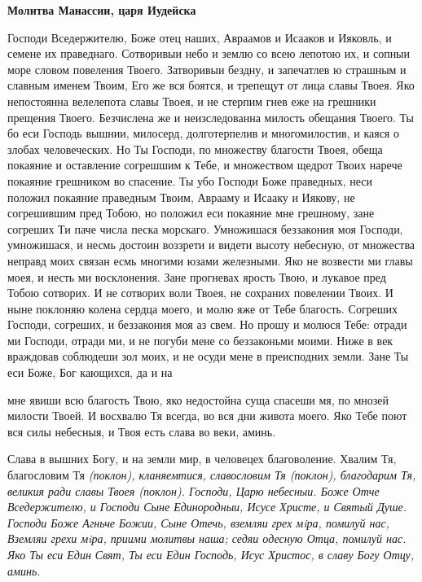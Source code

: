  

\bfseries Молитва Манассии, царя Иудейска\normalfont{}


   Господи Вседержителю, Боже отец наших, Авраамов и Исааков и
Ияковль, и семене их праведнаго. Сотворивыи небо и землю со всею лепотою
их, и сопныи море словом повеления Твоего. Затворивыи бездну, и
запечатлев ю страшным и славным именем Твоим, Его же вся боятся, и
трепещут от лица славы Твоея. Яко непостоянна велелепота славы Твоея,
и не стерпим гнев еже на грешники прещения Твоего. Безчислена
же и неизследованна милость обещания Твоего. Ты бо еси Господь
вышнии, милосерд, долготерпелив и многомилостив, и каяся о злобах
человеческих. Но Ты Господи, по множеству благости Твоея, обеща
покаяние и оставление согрешшим к Тебе, и множеством щедрот
Твоих нарече покаяние грешником во спасение. Ты убо Господи Боже
праведных, неси положил покаяние праведным Твоим, Аврааму и Исааку и
Иякову, не согрешившим пред Тобою, но положил еси покаяние мне
грешному, зане согреших Ти паче числа песка морскаго. Умножишася
беззакония моя Господи, умножишася, и несмь достоин воззрети и
видети высоту небесную, от множества неправд моих связан есмь
многими юзами железными. Яко не возвести ми главы моея, и несть ми
восклонения. Зане прогневах ярость Твою, и лукавое пред Тобою сотворих.
И не сотворих воли Твоея, не сохраних повелении Твоих. И ныне
поклоняю колена сердца моего, и молю яже от Тебе благость. Согреших
Господи, согреших, и беззакония моя аз свем. Но прошу и молюся
Тебе: отради ми Господи, отради ми, и не погуби мене со беззаконьми
моими. Ниже в век враждовав соблюдеши зол моих, и не осуди мене
в преисподних земли. Зане Ты еси Боже, Бог кающихся, да и на

мне явиши всю благость Твою, яко недостойна суща спасеши мя, по
мнозей милости Твоей. И восхвалю Тя всегда, во вся дни живота
моего. Яко Тебе поют вся силы небесныя, и Твоя есть слава во веки,
аминь.


   Слава в вышних Богу, и на земли мир, в человецех благоволение.
Хвалим Тя, благословим Тя \itshape (поклон)\normalfont{}, кланяемтися, славословим
Тя \itshape (поклон)\normalfont{}, благодарим Тя, великия ради славы Твоея \itshape (поклон)\normalfont{}.
Господи, Царю небесныи. Боже Отче Вседержителю, и Господи Сыне
Единородныи, Исусе Христе, и Святый Душе. Господи Боже Агньче Божии,
Сыне Отечь, вземляи грех мiра, помилуй нас, Вземляи грехи мiра,
приими молитвы наша; седяи одесную Отца, помилуй нас. Яко Ты еси
Един Свят, Ты еси Един Господь, Исус Христос, в славу Богу Отцу,
аминь.


